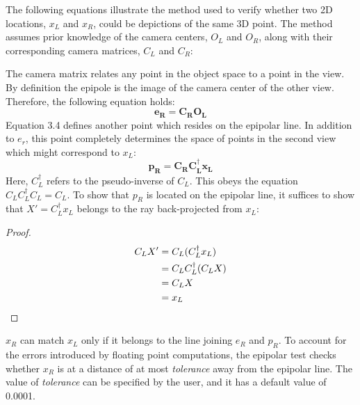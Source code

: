 \documentclass[12pt,a4paper,twoside,openright]{report}
\begin{document}
The following equations illustrate the method used to verify whether two 2D locations, $x_{L}$ and $x_{R}$, could be depictions of the same 3D point. The method assumes prior knowledge of the camera centers, $O_{L}$ and $O_{R}$, along with their corresponding camera matrices, $C_{L}$ and $C_{R}$:\\
\linebreak
\begin{adjustwidth}{0.7cm}{}
The camera matrix relates any point in the object space to a point in the view. By definition the epipole is the image of the camera center of the other view. Therefore, the following equation holds:
\begin{equation}
\mathbf{e_{R} = C_{R} O_{L}}
\end{equation}
\linebreak
Equation 3.4 defines another point which resides on the epipolar line. In addition to $e_{r}$, this point completely determines the space of points in the second view which might correspond to $x_{L}$:
\begin{equation}
\mathbf{p_{R} = C_{R} C_{L}^{\dagger} x_{L}}
\end{equation}
Here, $C_{L}^{\dagger}$ refers to the pseudo-inverse of $C_{L}$. This obeys the equation $C_{L} C_{L}^{\dagger} C_{L} = C_{L}$. 
\linebreak
To show that $p_{R}$ is located on the epipolar line, it suffices to show that $X' = C_{L}^{\dagger} x_{L}$ belongs to the ray back-projected from $x_{L}$:\\

\begin{proof} 
\begin{align}
C_{L}X' &= C_{L} (C_{L}^{\dagger} x_{L})\\
		&= C_{L} C_{L}^{\dagger} (C_{L} X)\\ 
		&= C_{L} X\\
		&= x_{L} \qedhere
 \end{align}
\end{proof}


$x_{R}$ can match $x_{L}$ only if it belongs to the line joining $e_{R}$ and $p_{R}$. To account for the errors introduced by floating point computations, the epipolar test checks whether $x_{R}$ is at a distance of at most \emph{tolerance} away from the epipolar line. The value of \emph{tolerance} can be specified by the user, and it has a default value of 0.0001.   
\end{adjustwidth}
\end{document}
